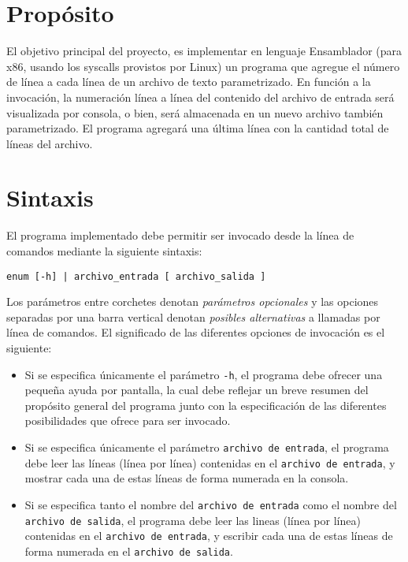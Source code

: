 \documentclass[12pt,a4paper]{article}
\begin{document}

\section*{Propósito}
El objetivo principal del proyecto, es implementar en lenguaje Ensamblador (para x86, usando los syscalls provistos por Linux) un programa que agregue el número de línea a cada línea de un archivo de texto parametrizado. En función a la invocación, la numeración línea a línea del contenido del archivo de entrada será visualizada por consola, o bien, será almacenada en un nuevo archivo también parametrizado. El programa agregará una última línea con la cantidad total de líneas del archivo.

\section*{Sintaxis}
El programa implementado debe permitir ser invocado desde la línea de comandos mediante la siguiente sintaxis:
\begin{center}
	\texttt{enum [-h] | archivo\_entrada [ archivo\_salida ]}
\end{center}

Los parámetros entre corchetes denotan \textit{parámetros opcionales} y las opciones separadas por una barra vertical denotan \textit{posibles alternativas} a llamadas por línea de comandos. El significado de las diferentes opciones de invocación es el siguiente:
\begin{itemize}
	\item Si se especifica únicamente el parámetro \texttt{-h}, el programa debe ofrecer una pequeña ayuda por pantalla, la cual debe reflejar un breve resumen del propósito general del programa junto con la especificación de las diferentes posibilidades que ofrece para ser invocado.
	\item Si se especifica únicamente el parámetro \texttt{archivo de entrada}, el programa debe leer las líneas (línea por línea) contenidas en el \texttt{archivo de entrada}, y mostrar cada una de estas líneas de forma numerada en la consola. 
	\item Si se especifica tanto el nombre del \texttt{archivo de entrada} como el nombre del \texttt{archivo de salida}, el programa debe leer las lineas (línea por línea) contenidas en el \texttt{archivo de entrada}, y escribir cada una de estas líneas de forma numerada en el \texttt{archivo de salida}.
\end{itemize}
	
\end{document}
